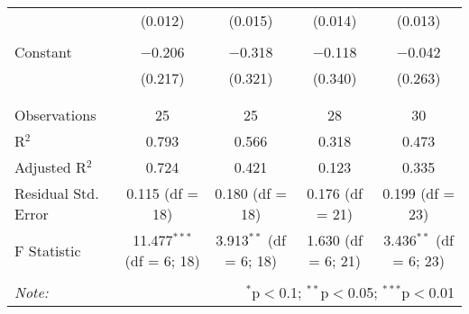 \begin{table}[!htbp]
\begin{tabular}{@{\extracolsep{5pt}}lcccc}
  & (0.012) & (0.015) & (0.014) & (0.013) \\ 
  & & & & \\ 
 Constant & $-$0.206 & $-$0.318 & $-$0.118 & $-$0.042 \\ 
  & (0.217) & (0.321) & (0.340) & (0.263) \\ 
  & & & & \\ 
\hline \\[-1.8ex] 
Observations & 25 & 25 & 28 & 30 \\ 
R$^{2}$ & 0.793 & 0.566 & 0.318 & 0.473 \\ 
Adjusted R$^{2}$ & 0.724 & 0.421 & 0.123 & 0.335 \\ 
Residual Std. Error & 0.115 (df = 18) & 0.180 (df = 18) & 0.176 (df = 21) & 0.199 (df = 23) \\ 
F Statistic & 11.477$^{***}$ (df = 6; 18) & 3.913$^{**}$ (df = 6; 18) & 1.630 (df = 6; 21) & 3.436$^{**}$ (df = 6; 23) \\ 
\hline 
\hline \\[-1.8ex] 
\textit{Note:}  & \multicolumn{4}{r}{$^{*}$p$<$0.1; $^{**}$p$<$0.05; $^{***}$p$<$0.01} \\ 
\end{tabular} 
\end{table} 
